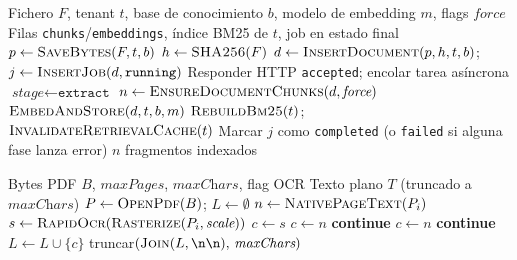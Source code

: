 \begin{algorithm}[htbp]
\caption{Ingesta RAG end-to-end (\texttt{ingest\_uploaded\_document})}
\label{alg:rag-ingest}
\begin{algorithmic}[1]
\Require Fichero $F$, tenant $t$, base de conocimiento $b$, modelo de embedding $m$, flags $\textit{force}$
\Ensure Filas \texttt{chunks}/\texttt{embeddings}, índice BM25 de $t$, job en estado final
\State $p \gets \textsc{SaveBytes}(F, t, b)$ 
\State $h \gets \textsc{SHA256}(F)$
\State $d \gets \textsc{InsertDocument}(p, h, t, b)$;\; $j \gets \textsc{InsertJob}(d, \texttt{running})$
\State Responder HTTP \texttt{accepted}; encolar tarea asíncrona
\State $\textit{stage} \gets \texttt{extract}$
\State $n \gets \textsc{EnsureDocumentChunks}(d, \textit{force})$ 
\State $\textsc{EmbedAndStore}(d, t, b, m)$ 
\State $\textsc{RebuildBm25}(t)$;\; $\textsc{InvalidateRetrievalCache}(t)$
\State Marcar $j$ como \texttt{completed} (o \texttt{failed} si alguna fase lanza error)
\State \Return $n$ fragmentos indexados
\end{algorithmic}
\end{algorithm}

\begin{algorithm}[htbp]
\caption{Extracción de texto PDF (nativo + OCR selectivo)}
\label{alg:extract-pdf}
\begin{algorithmic}[1]
\Require Bytes PDF $B$, $\textit{maxPages}$, $\textit{maxChars}$, flag OCR
\Ensure Texto plano $T$ (truncado a $\textit{maxChars}$)
\State $P \gets \textsc{OpenPdf}(B)$;\; $L \gets \emptyset$
  \State $n \gets \textsc{NativePageText}(P_i)$
    \State $s \gets \textsc{RapidOcr}(\textsc{Rasterize}(P_i, \textit{scale}))$
      \State $c \gets s$
      \State $c \gets n$
    \Else
      \State \textbf{continue} 
    \EndIf
    \State $c \gets n$
  \Else
    \State \textbf{continue}
  \EndIf
  \State $L \gets L \cup \{c\}$
\EndFor
\State \Return truncar$(\textsc{Join}(L,\texttt{\textbackslash n\textbackslash n}),\,\textit{maxChars})$
\end{algorithmic}
\end{algorithm}

